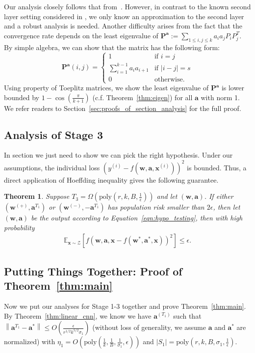\documentclass[11pt]{article}
\newcommand{\poly}{\mathrm{poly}}
\newcommand{\mat}[1]{\mathbf{#1}}
\newcommand{\vect}[1]{\mathbf{#1}}
\newcommand{\norm}[1]{\left\|#1\right\|}
\newcommand{\abs}[1]{\left|#1\right|}
\newcommand{\expect}{\mathbb{E}}
\newcommand{\inputdist}{\mathcal{Z}}
\newtheorem{thm}{Theorem}[section]
\begin{document}
Our analysis closely follows that from~\cite{goel2018learning}. However, in contrast to the known second layer setting considered in \cite{goel2018learning}, we only know an approximation to the second layer and a robust analysis is needed.
Another difficulty arises from the fact that the convergence rate depends on the least eigenvalue of $\mat{P}^{\vect{a}}:= \sum_{1 \leq i,j \leq k} a_i a_j P_i P_j^T$. By simple algebra, we can show that the matrix has the following form:
\[
\mat{P}^{\vect{a}}(i,j) = 	\begin{cases}
								1 &\text{if } i = j\\
								\sum_{i=1}^{k-1} a_i a_{i+1} & \text{if } |i - j| = s\\
								0 &\text{otherwise}.
							\end{cases}
\]
Using property of Toeplitz matrices, we show the least eigenvalue of $\mat{P}^{\vect{a}}$ is lower bounded by $1-\cos\left(\frac{\pi}{k+1}\right)$ (c.f. Theorem~\ref{thm:eigen}) for all $\vect{a}$ with norm 1. We refer readers to Section~\ref{sec:proofs_of_section_analysis} for the full proof.
\subsection{Analysis of Stage 3}
In section we just need to show we can pick the right hypothesis.
Under our assumptions, the individual loss $(y^{(i)}-f(\vect{w},\vect{a},\vect{x}^{(i)}))^2$ is bounded.
Thus, a direct application of Hoeffding inequality gives the following guarantee.
\begin{thm}\label{thm:validation}
Suppose $T_3 = \Omega\left(\poly\left(r,k,B,\frac{1}{\epsilon}\right)\right)$ and let $\left(\vect{w},\vect{a}\right)$.
If either $\left(\vect{w}^{(+)},\vect{a}^{T_1}\right)$ or $\left(\vect{w}^{(-)},-\vect{a}^{T_1}\right)$ has population risk smaller than $2\epsilon$, then let $\left(\vect{w},\vect{a}\right)$
 be the output according to Equation~\eqref{eqn:hypo_testing}, then with high probability \begin{align*}
\expect_{\vect{x}\sim \inputdist} \left[f(\vect{w},\vect{a},\vect{x}-f(\vect{w}^*,\vect{a}^*,\vect{x}))^2\right] \le \epsilon.
\end{align*}
\end{thm}\subsection{Putting Things Together: Proof of Theorem~\ref{thm:main}}
Now we put our analyses for Stage 1-3 together and prove Theorem~\ref{thm:main}.
By Theorem~\ref{thm:linear_cnn}, we know we have $\vect{a}^{\left(T_1\right)}$ such that $\norm{\vect{a}^{T_1}-\vect{a}^*} \le O\left(\frac{\epsilon}{r^{1/2}k^{5/2}\sigma_1}\right)$ (without loss of generality, we assume $\vect{a}$ and $\vect{a}^*$ are normalized) with $\eta_1 = O\left(\poly\left(\frac{1}{k},\frac{1}{B},\frac{1}{\sigma_1},\epsilon\right)\right)$ and $\abs{S_1} = \poly\left(r,k,B,\sigma_1,\frac{1}{\epsilon}\right)$.
\end{document}
